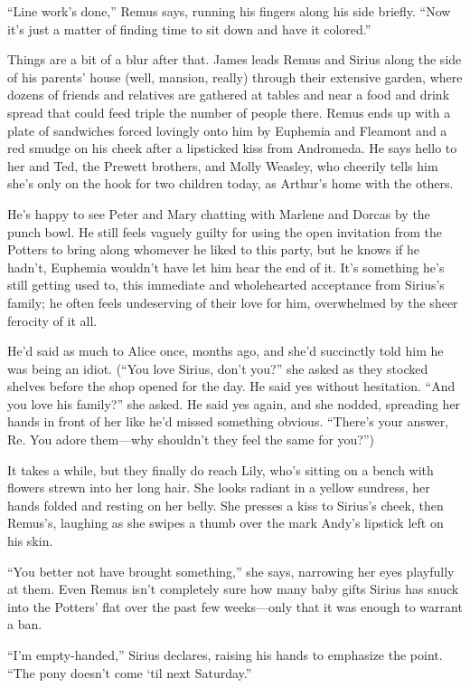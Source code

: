 “Line work’s done,” Remus says, running his fingers along his side briefly. “Now it’s just a matter of finding time to sit down and have it colored.”

Things are a bit of a blur after that. James leads Remus and Sirius along the side of his parents’ house (well, mansion, really) through their extensive garden, where dozens of friends and relatives are gathered at tables and near a food and drink spread that could feed triple the number of people there. Remus ends up with a plate of sandwiches forced lovingly onto him by Euphemia and Fleamont and a red smudge on his cheek after a lipsticked kiss from Andromeda. He says hello to her and Ted, the Prewett brothers, and Molly Weasley, who cheerily tells him she’s only on the hook for two children today, as Arthur’s home with the others.

He’s happy to see Peter and Mary chatting with Marlene and Dorcas by the punch bowl. He still feels vaguely guilty for using the open invitation from the Potters to bring along whomever he liked to this party, but he knows if he hadn’t, Euphemia wouldn’t have let him hear the end of it. It’s something he’s still getting used to, this immediate and wholehearted acceptance from Sirius’s family; he often feels undeserving of their love for him, overwhelmed by the sheer ferocity of it all.

He’d said as much to Alice once, months ago, and she’d succinctly told him he was being an idiot. (“You love Sirius, don’t you?” she asked as they stocked shelves before the shop opened for the day. He said yes without hesitation. “And you love his family?” she asked. He said yes again, and she nodded, spreading her hands in front of her like he’d missed something obvious. “There’s your answer, Re. You adore them—why shouldn’t they feel the same for you?”)

It takes a while, but they finally do reach Lily, who’s sitting on a bench with flowers strewn into her long hair. She looks radiant in a yellow sundress, her hands folded and resting on her belly. She presses a kiss to Sirius’s cheek, then Remus’s, laughing as she swipes a thumb over the mark Andy’s lipstick left on his skin.

“You better not have brought something,” she says, narrowing her eyes playfully at them. Even Remus isn’t completely sure how many baby gifts Sirius has snuck into the Potters’ flat over the past few weeks—only that it was enough to warrant a ban.

“I’m empty-handed,” Sirius declares, raising his hands to emphasize the point. “The pony doesn’t come ‘til next Saturday.”

